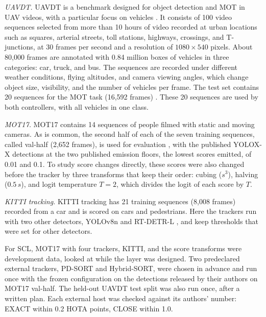 \emph{UAVDT.} UAVDT is a benchmark designed for object detection and MOT in UAV videos, with a particular focus on vehicles \cite{du2018uavdt}. It consists of 100 video sequences selected from more than 10 hours of video recorded at urban locations such as squares, arterial streets, toll stations, highways, crossings, and T-junctions, at 30 frames per second and a resolution of $1080\times540$ pixels. About 80,000 frames are annotated with 0.84 million boxes of vehicles in three categories: car, truck, and bus. The sequences are recorded under different weather conditions, flying altitudes, and camera viewing angles, which change object size, visibility, and the number of vehicles per frame. The test set contains 20 sequences for the MOT task (16,592 frames) \cite{du2018uavdt}. These 20 sequences are used by both controllers, with all vehicles in one class.

\emph{MOT17.} MOT17 \cite{milan2016mot16} contains 14 sequences of people filmed with static and moving cameras. As is common, the second half of each of the seven training sequences, called val-half (2,652 frames), is used for evaluation \cite{zhang2022bytetrack}, with the published YOLOX-X detections \cite{ge2021yolox} at the two published emission floors, the lowest scores emitted, of 0.01 and 0.1. To study score changes directly, these scores were also changed before the tracker by three transforms that keep their order: cubing ($s^3$), halving ($0.5\,s$), and logit temperature $T=2$, which divides the logit of each score by $T$.

\emph{KITTI tracking.} KITTI tracking \cite{geiger2012kitti} has 21 training sequences (8,008 frames) recorded from a car and is scored on cars and pedestrians. Here the trackers run with two other detectors, YOLOv8n \cite{jocher2023yolov8} and RT-DETR-L \cite{zhao2024rtdetr}, and keep thresholds that were set for other detectors.

For SCL, MOT17 with four trackers, KITTI, and the score transforms were development data, looked at while the layer was designed. Two predeclared external trackers, PD-SORT and Hybrid-SORT, were chosen in advance and run once with the frozen configuration on the detections released by their authors on MOT17 val-half. The held-out UAVDT test split was also run once, after a written plan. Each external host was checked against its authors' number: EXACT within 0.2 HOTA points, CLOSE within 1.0.

